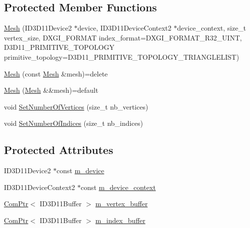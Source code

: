 \subsection*{Protected Member Functions}
\begin{DoxyCompactItemize}
\item 
\hyperlink{classmage_1_1_mesh_a364e6ecdca96e9b4932aea8711f2bb12}{Mesh} (I\+D3\+D11\+Device2 $\ast$device, I\+D3\+D11\+Device\+Context2 $\ast$device\+\_\+context, size\+\_\+t vertex\+\_\+size, D\+X\+G\+I\+\_\+\+F\+O\+R\+M\+AT index\+\_\+format=D\+X\+G\+I\+\_\+\+F\+O\+R\+M\+A\+T\+\_\+\+R32\+\_\+\+U\+I\+NT, D3\+D11\+\_\+\+P\+R\+I\+M\+I\+T\+I\+V\+E\+\_\+\+T\+O\+P\+O\+L\+O\+GY primitive\+\_\+topology=D3\+D11\+\_\+\+P\+R\+I\+M\+I\+T\+I\+V\+E\+\_\+\+T\+O\+P\+O\+L\+O\+G\+Y\+\_\+\+T\+R\+I\+A\+N\+G\+L\+E\+L\+I\+ST)
\item 
\hyperlink{classmage_1_1_mesh_a1627e85c72d10bdedbfbf746b108cc73}{Mesh} (const \hyperlink{classmage_1_1_mesh}{Mesh} \&mesh)=delete
\item 
\hyperlink{classmage_1_1_mesh_ab2c1131c72dc9a8c765257f27a304112}{Mesh} (\hyperlink{classmage_1_1_mesh}{Mesh} \&\&mesh)=default
\item 
void \hyperlink{classmage_1_1_mesh_a7d871e56f4489e7aa0557688662589bb}{Set\+Number\+Of\+Vertices} (size\+\_\+t nb\+\_\+vertices)
\item 
void \hyperlink{classmage_1_1_mesh_a19336d13ef5219c196678b8fdf4cca2b}{Set\+Number\+Of\+Indices} (size\+\_\+t nb\+\_\+indices)
\end{DoxyCompactItemize}
\subsection*{Protected Attributes}
\begin{DoxyCompactItemize}
\item 
I\+D3\+D11\+Device2 $\ast$const \hyperlink{classmage_1_1_mesh_ad1d91b6048d73bb05d0d39028d048f18}{m\+\_\+device}
\item 
I\+D3\+D11\+Device\+Context2 $\ast$const \hyperlink{classmage_1_1_mesh_a1d19b5bceea2256f4d80ebc06fa74f00}{m\+\_\+device\+\_\+context}
\item 
\hyperlink{namespacemage_ae74f374780900893caa5555d1031fd79}{Com\+Ptr}$<$ I\+D3\+D11\+Buffer $>$ \hyperlink{classmage_1_1_mesh_af5ae74887eb330201829477cf772ba6e}{m\+\_\+vertex\+\_\+buffer}
\item 
\hyperlink{namespacemage_ae74f374780900893caa5555d1031fd79}{Com\+Ptr}$<$ I\+D3\+D11\+Buffer $>$ \hyperlink{classmage_1_1_mesh_abe29363ebac77b284ca69532fd5b3373}{m\+\_\+index\+\_\+buffer}
\end{DoxyCompactItemize}

